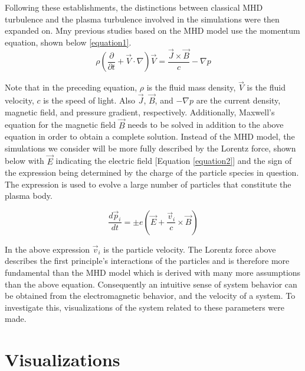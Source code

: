 \documentclass[journal, a4paper]{IEEEtran}
\begin{document}
 Following these establishments, the distinctions between classical MHD turbulence and the plasma turbulence involved in the simulations were then expanded on. Mny previous studies based on the MHD model use the momentum equation, shown below \ref{equation1}.
\vspace{.5cm}
\begin{equation}
\rho(\frac{\partial}{\partial t}+\vec{V} \cdotp \nabla)\vec{V}=\frac{\vec{J} \times \vec{B}}{c}-\nabla p
\label{equation1}
\end{equation}
\vspace{.3cm}

Note that in the preceding equation, $\rho$ is the fluid mass density, $\vec{V}$ is the fluid velocity, $c$ is the speed of light. Also $\vec{J}$, $\vec{B}$, and $-\nabla p$ are the current density, magnetic field, and pressure gradient, respectively. Additionally, Maxwell's equation for the magnetic field $\vec{B}$ needs to be solved in addition to the above equation in order to obtain a complete solution. Instead of the MHD model, the simulations we consider will be more fully described by the Lorentz force, shown below with $\vec{E}$ indicating the electric field [Equation \eqref{equation2}] and the sign of the expression being determined by the charge of the particle species in question. The expression is used to evolve a large number of particles that constitute the plasma body.

\vspace{.3cm}
\begin{equation}
\frac{d\vec{p}_i}{dt}=\pm e(\vec{E}+\frac{\vec{v}_i}{c} \times \vec{B})
\label{equation2}
\end{equation}
\vspace{.3cm}

In the above expression $ \vec{v}_i$ is the particle velocity. The Lorentz force above describes the first principle's interactions of the particles and is therefore more fundamental than the MHD model which is derived with many more assumptions than the above equation. Consequently an intuitive sense of system behavior can be obtained from the electromagnetic behavior, and the velocity of a system. To investigate this, visualizations of the system related to these parameters were made.

\vspace{.4cm}
\section{Visualizations}
\vspace{.4cm}
\end{document}
